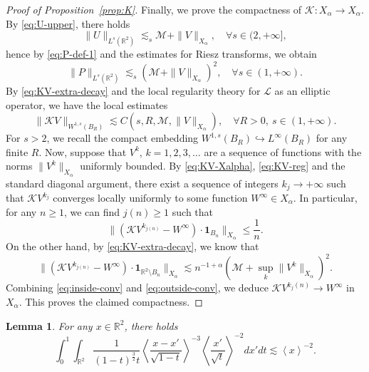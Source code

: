 \documentclass[12pt,reqno]{amsart}
\theoremstyle{plain}
\newtheorem{lemma}[theorem]{Lemma}
\theoremstyle{definition}
\newcommand{\R}{\mathbb{R}}
\newcommand{\M}{\mathcal{M}}
\renewcommand{\:}{\colon}
\numberwithin{equation}{section}
\numberwithin{figure}{section}
\begin{document}
\begin{proof}[Proof of Proposition~\ref{prop:K}]
    Finally, we prove the compactness of $\mathcal{K}: X_\alpha \to X_\alpha$. By \eqref{eq:U-upper}, there holds
    \begin{equation} \label{eq:U-Ls-1}
        \|U\|_{ L^s(\R^2)} \lesssim_{s} \M + \|V\|_{X_\alpha}, \quad \forall s \in (2, +\infty],
    \end{equation}
    hence by \eqref{eq:P-def-1} and the estimates for Riesz transforms, we obtain
    \begin{equation} \label{eq:P-Ls-1}
        \|P\|_{ L^s(\R^2)} \lesssim_s (\M + \|V\|_{X_\alpha})^2, \quad \forall s \in (1, +\infty).
    \end{equation}
    By \eqref{eq:KV-extra-decay} and the local regularity theory for $\mathcal{L}$ as an elliptic operator, we have the local estimates
    \begin{equation} \label{eq:KV-reg}
        \|\mathcal{K}V\|_{W^{1,s}(B_R)} \lesssim C(s, R, \M, \|V\|_{X_\alpha}), \quad \forall R>0, \ s \in (1, +\infty).
    \end{equation}
    For $s > 2$, we recall the compact embedding $W^{1,s}(B_R) \hookrightarrow L^\infty(B_R)$ for any finite $R$. Now, suppose that $V^{k}$, $k = 1,2,3,\dots$ are a sequence of functions with the norms $\|V^{k}\|_{X_\alpha}$ uniformly bounded. By \eqref{eq:KV-Xalpha}, \eqref{eq:KV-reg}  and the standard diagonal argument, there exist a sequence of integers $k_j \to +\infty$ such that $\mathcal{K} V^{k_j}$ converges locally uniformly to some function $W^\infty \in X_\alpha$. In particular, for any $n \ge 1$, we can find $j(n) \ge 1$ such that 
    \begin{equation} \label{eq:inside-conv}
        \|(\mathcal{K}V^{k_{j(n)}} - W^\infty) \cdot \mathbf{1}_{B_n}\|_{X_\alpha} \le \frac{1}{n}.
    \end{equation} 
     On the other hand, by \eqref{eq:KV-extra-decay}, we know that
     \begin{equation} \label{eq:outside-conv}
         \|(\mathcal{K}V^{k_{j(n)}} - W^\infty) \cdot \mathbf{1}_{\R^2\setminus B_n}\|_{X_\alpha} \lesssim n^{-1+\alpha} \left(\M+\sup_k \|V^k\|_{X_\alpha}\right)^2.
     \end{equation} 
    Combining \eqref{eq:inside-conv} and \eqref{eq:outside-conv}, we deduce $\mathcal{K}V^{k_j(n)} \to W^\infty$ in $X_\alpha$. This proves the claimed compactness.

    
\end{proof}

\begin{lemma} \label{lem:integral} For any $x \in \R^2$, there holds
    \begin{equation} \label{eq:integral}
        \int_0^1 \int_{\R^2} \frac{1}{(1-t)^\frac32 t} \left\langle \frac{x-x'}{\sqrt{1-t}} \right\rangle^{-3} \left\langle \frac{x'}{\sqrt{t}} \right\rangle^{-2}  dx'dt \lesssim \left\langle x \right\rangle^{-2}.
    \end{equation}
\end{lemma}
\end{document}
